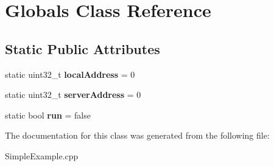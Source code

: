 \hypertarget{classGlobals}{\section{\-Globals \-Class \-Reference}
\label{classGlobals}
}
\subsection*{\-Static \-Public \-Attributes}
\begin{DoxyCompactItemize}
\item 
\hypertarget{classGlobals_a7273fea18ac30db3ade2a248ebe4e32b}{static uint32\-\_\-t {\bfseries local\-Address} = 0}\label{classGlobals_a7273fea18ac30db3ade2a248ebe4e32b}

\item 
\hypertarget{classGlobals_a7bc283a83c9aece307ee8aa0ffaa28bd}{static uint32\-\_\-t {\bfseries server\-Address} = 0}\label{classGlobals_a7bc283a83c9aece307ee8aa0ffaa28bd}

\item 
\hypertarget{classGlobals_a393682b9852698c20b5812496bc5639c}{static bool {\bfseries run} = false}\label{classGlobals_a393682b9852698c20b5812496bc5639c}

\end{DoxyCompactItemize}


\-The documentation for this class was generated from the following file\-:\begin{DoxyCompactItemize}
\item 
\-Simple\-Example.\-cpp\end{DoxyCompactItemize}
